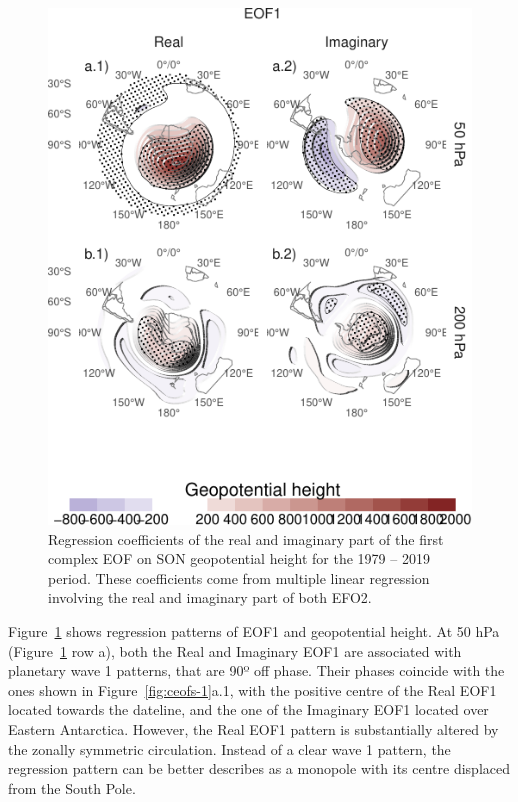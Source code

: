 \documentclass[smallextended]{svjour3}       %
\begin{document}
\begin{figure}
\centering
\includegraphics{../figures/eof1-regr-gh-1.pdf}
\caption{\label{fig:eof1-regr-gh}Regression coefficients of the real and imaginary part of the first complex EOF on SON geopotential height for the 1979 -- 2019 period. These coefficients come from multiple linear regression involving the real and imaginary part of both EFO2.}
\end{figure}

Figure~\ref{fig:eof1-regr-gh} shows regression patterns of EOF1 and geopotential height. At 50 hPa (Figure~\ref{fig:eof1-regr-gh} row a), both the Real and Imaginary EOF1 are associated with planetary wave 1 patterns, that are 90º off phase. Their phases coincide with the ones shown in Figure~\ref{fig:ceofs-1}a.1, with the positive centre of the Real EOF1 located towards the dateline, and the one of the Imaginary EOF1 located over Eastern Antarctica. However, the Real EOF1 pattern is substantially altered by the zonally symmetric circulation. Instead of a clear wave 1 pattern, the regression pattern can be better describes as a monopole with its centre displaced from the South Pole.
\end{document}
